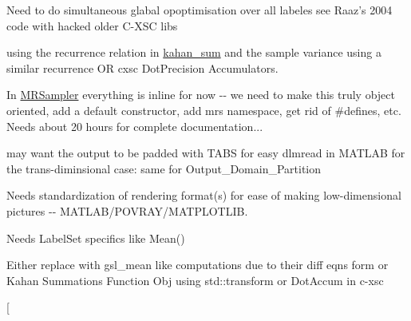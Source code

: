 \begin{DoxyRefList}
\-Need to do simultaneous glabal opoptimisation over all labeles see \-Raaz's 2004 code with hacked older \-C-\/\-X\-S\-C libs  
\item[\label{todo__todo000015}%
\hypertarget{todo__todo000015}{}%
\-Member \hyperlink{toolz_8hpp_a9efdc4ede6e6e3539c2ddca8b71e79a8}{mean\-\_\-var} (const vector$<$ real $>$ \&x, real \&mean, real \&var)]using the recurrence relation in \hyperlink{structkahan__sum}{kahan\-\_\-sum} and the sample variance using a similar recurrence \-O\-R cxsc \-Dot\-Precision \-Accumulators.  
\item[\label{todo__todo000005}%
\hypertarget{todo__todo000005}{}%
\-Class \hyperlink{classMRSampler}{\-M\-R\-Sampler} ]\-In \hyperlink{classMRSampler}{\-M\-R\-Sampler} everything is inline for now -\/-\/ we need to make this truly object oriented, add a default constructor, add mrs namespace, get rid of \#defines, etc. \-Needs about 20 hours for complete documentation...  
\item[\label{todo__todo000004}%
\hypertarget{todo__todo000004}{}%
\-Member \hyperlink{classMRSampler_a7142c1478e259ec85354407fccfbfa78}{\-M\-R\-Sampler\-:\-:\-M\-R\-Soutput} (std\-::ostream \&os, const double eps=0) const ]may want the output to be padded with \-T\-A\-B\-S for easy dlmread in \-M\-A\-T\-L\-A\-B for the trans-\/diminsional case\-: same for \-Output\-\_\-\-Domain\-\_\-\-Partition  
\item[\label{todo__todo000006}%
\hypertarget{todo__todo000006}{}%
\-Member \hyperlink{classMRSampler_a25d99bdee1a715fb2a8e2a8068b890db}{\-M\-R\-Sampler\-:\-:\-Print\-Boxes} (int \-Nprint)]\-Needs standardization of rendering format(s) for ease of making low-\/dimensional pictures -\/-\/ \-M\-A\-T\-L\-A\-B/\-P\-O\-V\-R\-A\-Y/\-M\-A\-T\-P\-L\-O\-T\-L\-I\-B.  
\item[\label{todo__todo000009}%
\hypertarget{todo__todo000009}{}%
\-Member \hyperlink{classRSSample_a9537562ed9b4bc945e4c92b2237732a8}{\-R\-S\-Sample\-:\-:\-Integral\-Estimate} ()]\-Needs \-Label\-Set specifics like \-Mean()  
\item[\label{todo__todo000010}%
\hypertarget{todo__todo000010}{}%
\-Member \hyperlink{classRSSample_a6e553a95e36dbecd6f0491bf71c6a761}{\-R\-S\-Sample\-:\-:\-Mean} ()]\-Either replace with gsl\-\_\-mean like computations due to their diff eqns form or \-Kahan \-Summations \-Function \-Obj using std\-::transform or \-Dot\-Accum in c-\/xsc  
\item[\label{todo__todo000008}%
\hypertarget{todo__todo000008}{}%

\end{DoxyRefList}
